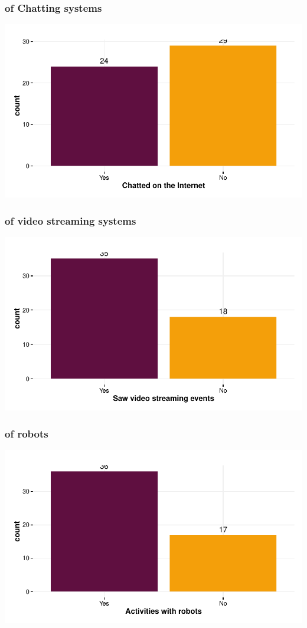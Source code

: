 \documentclass{article}
\begin{document}
\subsubsection{of Chatting systems}
\includegraphics{Raw_num/plots/-plot_chat_net}

\subsubsection{of video streaming systems}
\includegraphics{Raw_num/plots/-plot_video_stream}

\subsubsection{of robots}
\includegraphics{Raw_num/plots/-plot_past_robot}
\end{document}
